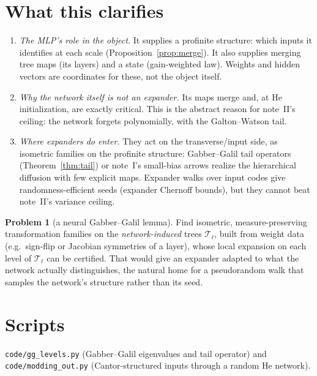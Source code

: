 \documentclass[11pt]{article}
\theoremstyle{definition}
\newtheorem{problem}[theorem]{Problem}
\theoremstyle{remark}
\begin{document}
\section{What this clarifies}
\begin{enumerate}
\item \emph{The MLP's role in the object.} It supplies a profinite structure: which inputs it identifies at each scale (Proposition~\ref{prop:merge}). It also supplies merging tree maps (its layers) and a state (gain-weighted law). Weights and hidden vectors are coordinates for these, not the object itself.
\item \emph{Why the network itself is not an expander.} Its maps merge and, at He initialization, are exactly critical. This is the abstract reason for note~II's ceiling: the network forgets polynomially, with the Galton--Watson tail.
\item \emph{Where expanders do enter.} They act on the transverse/input side, as isometric families on the profinite structure: Gabber--Galil tail operators (Theorem~\ref{thm:tail}) or note~I's small-bias arrows realize the hierarchical diffusion with few explicit maps. Expander walks over input codes give randomness-efficient seeds (expander Chernoff bounds), but they cannot beat note~II's variance ceiling.
\end{enumerate}

\begin{problem}[a neural Gabber--Galil lemma]
Find isometric, measure-preserving transformation families on the \emph{network-induced} trees $\mathcal T_\ell$, built from weight data (e.g.\ sign-flip or Jacobian symmetries of a layer), whose local expansion on each level of $\mathcal T_\ell$ can be certified. That would give an expander adapted to what the network actually distinguishes, the natural home for a pseudorandom walk that samples the network's structure rather than its seed.
\end{problem}

\appendix
\section{Scripts}
\texttt{code/gg\_levels.py} (Gabber--Galil eigenvalues and tail operator) and \texttt{code/modding\_out.py} (Cantor-structured inputs through a random He network).
\end{document}
